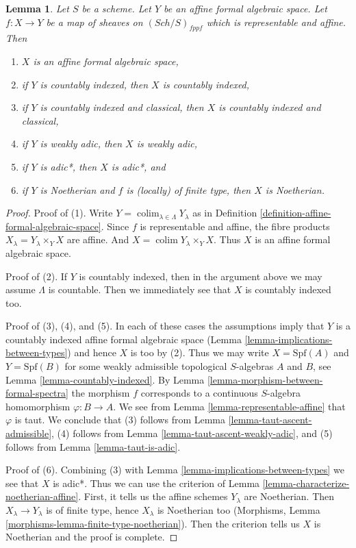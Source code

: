 \documentclass{stacks-project}
\theoremstyle{plain}
\newtheorem{lemma}[subsection]{Lemma}
\theoremstyle{definition}
\theoremstyle{remark}
\numberwithin{equation}{subsection}
\def\colim{\mathop{\mathrm{colim}}\nolimits}
\def\Sch{\mathit{Sch}}
\begin{document}
\begin{lemma}
\label{lemma-property-goes-up-affine-morphism}
Let $S$ be a scheme. Let $Y$ be an affine formal algebraic space.
Let $f : X \to Y$ be a map of sheaves on $(\Sch/S)_{fppf}$ which
is representable and affine. Then
\begin{enumerate}
\item $X$ is an affine formal algebraic space,
\item if $Y$ is countably indexed, then $X$ is countably indexed,
\item if $Y$ is countably indexed and classical, then $X$ is
countably indexed and classical,
\item if $Y$ is weakly adic, then $X$ is weakly adic,
\item if $Y$ is adic*, then $X$ is adic*, and
\item if $Y$ is Noetherian and $f$ is (locally) of finite type, then
$X$ is Noetherian.
\end{enumerate}
\end{lemma}

\begin{proof}
Proof of (1). Write $Y = \colim_{\lambda \in \Lambda} Y_\lambda$ as in
Definition \ref{definition-affine-formal-algebraic-space}.
Since $f$ is representable and affine, the fibre products
$X_\lambda = Y_\lambda \times_Y X$ are affine. And
$X = \colim Y_\lambda \times_Y X$.
Thus $X$ is an affine formal algebraic space.

\medskip\noindent
Proof of (2). If $Y$ is countably indexed, then in the argument above
we may assume $\Lambda$ is countable.
Then we immediately see that $X$ is countably indexed too.

\medskip\noindent
Proof of (3), (4), and (5). In each of these cases the assumptions imply
that $Y$ is a countably indexed affine formal algebraic space
(Lemma \ref{lemma-implications-between-types})
and hence $X$ is too by (2). Thus we may write $X = \text{Spf}(A)$
and $Y = \text{Spf}(B)$ for some weakly admissible topological
$S$-algebras $A$ and $B$, see Lemma \ref{lemma-countably-indexed}.
By Lemma \ref{lemma-morphism-between-formal-spectra}
the morphism $f$ corresponds to a continuous $S$-algebra
homomorphism $\varphi : B \to A$. We see from
Lemma \ref{lemma-representable-affine} that $\varphi$ is taut. We conclude that
(3) follows from Lemma \ref{lemma-taut-ascent-admissible},
(4) follows from Lemma \ref{lemma-taut-ascent-weakly-adic}, and
(5) follows from Lemma \ref{lemma-taut-is-adic}.

\medskip\noindent
Proof of (6). Combining (3) with Lemma \ref{lemma-implications-between-types}
we see that $X$ is adic*. Thus we can use the criterion of
Lemma \ref{lemma-characterize-noetherian-affine}.
First, it tells us the affine schemes $Y_\lambda$ are Noetherian.
Then $X_\lambda \to Y_\lambda$ is of finite type, hence $X_\lambda$
is Noetherian too (Morphisms, Lemma
\ref{morphisms-lemma-finite-type-noetherian}).
Then the criterion tells us $X$ is Noetherian and the proof is
complete.
\end{proof}
\end{document}
